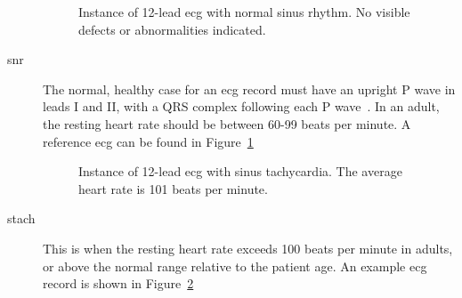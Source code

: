 \documentclass[\main/thesis.tex]{subfiles}
\begin{document}
\begin{description}
    \begin{figure}[H]
        \centering
        \caption{Instance of 12-lead \gls{ecg} with normal sinus rhythm. No visible defects or abnormalities indicated.}
        \label{fig:full_SNR}
    \end{figure}
    \item[\gls{snr}] The normal, healthy case for an \gls{ecg} record must have an upright P wave in leads I and II, with a QRS complex following each P wave~\cite{meek_introduction_2002}. In an adult, the resting heart rate should be between 60-99 beats per minute.
    A reference \gls{ecg} can be found in Figure~\ref{fig:full_SNR}

    \begin{figure}[H]
        \centering
        \caption{Instance of 12-lead \gls{ecg} with sinus tachycardia. The average heart rate is 101 beats per minute.}
        \label{fig:full_STach}
    \end{figure}
    \item[\gls{stach}] This is when the resting heart rate exceeds 100 beats per minute in adults, or above the normal range relative to the patient age.
    An example \gls{ecg} record is shown in Figure~\ref{fig:full_STach}


\end{description}
\end{document}
